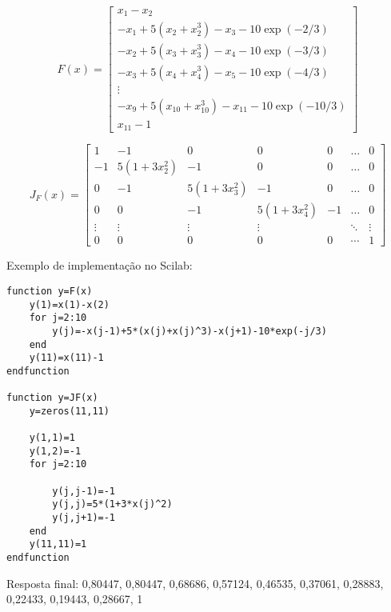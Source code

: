 \begin{resp}
\begin{equation}F\left(x\right)=\left[
\begin{array}{c}
x_1-x_2\\[.2cm]
-x_{1}+5(x_2+x_2^3)-x_{3}-10\exp(-2/3)\\[.2cm]
-x_{2}+5(x_3+x_3^3)-x_{4}-10\exp(-3/3)\\[.2cm]
-x_{3}+5(x_4+x_4^3)-x_{5}-10\exp(-4/3)\\[.2cm]
\vdots\\
-x_{9}+5(x_{10}+x_{10}^3)-x_{11}-10\exp(-10/3)\\[.2cm]
x_{11}-1
\end{array}\right] \end{equation}

\begin{equation}J_F(x)=\left[
\begin{array}{ccccccc}
1& -1 &0 &0 &0&\ldots & 0\\[.2cm]
-1&5(1+3x_2^2)& -1&0&0&\ldots & 0\\[.2cm]
0&-1&5(1+3x_3^2)& -1&0&\ldots & 0\\[.2cm]
0&0&-1&5(1+3x_4^2)& -1&\ldots & 0\\[.2cm]
\vdots &\vdots &\vdots &\vdots &&\ddots&\vdots\\[.2cm]
0&0&0&0&0&\cdots&1
\end{array}
\right]
\end{equation}

\ifisscilab
Exemplo de implementação no Scilab:
\begin{verbatim}
function y=F(x)
    y(1)=x(1)-x(2)
    for j=2:10
        y(j)=-x(j-1)+5*(x(j)+x(j)^3)-x(j+1)-10*exp(-j/3)
    end
    y(11)=x(11)-1
endfunction

function y=JF(x)
    y=zeros(11,11)

    y(1,1)=1
    y(1,2)=-1
    for j=2:10

        y(j,j-1)=-1
        y(j,j)=5*(1+3*x(j)^2)
        y(j,j+1)=-1
    end
    y(11,11)=1
endfunction
\end{verbatim}
\fi

Resposta final: 0,80447, 0,80447, 0,68686, 0,57124, 0,46535,
0,37061, 0,28883, 0,22433, 0,19443, 0,28667,  1
\end{resp}


